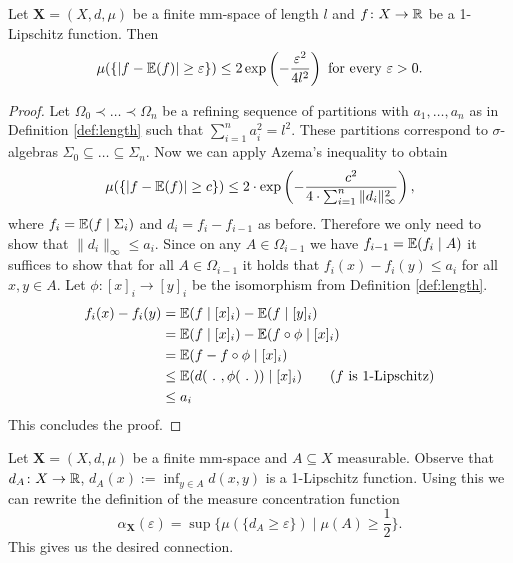 \begin{lemma}\label{lem:lipschitz}
Let $\boldsymbol{X}=(X,d,\mu)$ be a finite mm-space of length $l$ and $f\colon X\to\mathbb{R}$ be a 1-Lipschitz function. Then
\[\mu(\{|f-\mathbb{E}(f)|\geq\varepsilon\})\leq 2\exp\left(-\frac{\varepsilon^2}{4l^2}\right)\text{ for every $\varepsilon>0$.}\] 
\end{lemma}
\begin{proof}
Let 
$\Omega_0\prec\dots\prec\Omega_n$
be a refining sequence of partitions with $a_1,\dots,a_n$ as in Definition \ref{def:length} such that $\sum_{i=1}^{n}a_i^2=l^2$. These partitions correspond to $\sigma$-algebras $\Sigma_0\subseteq\dots\subseteq\Sigma_n$. Now we can apply Azema's inequality to obtain
\[\mu(\{|f-\mathbb{E}(f)|\geq c\})\leq 2\cdot\exp\left(-\frac{c^2}{4\cdot\sum_{i=1}^{n}\|d_i\|^2_\infty}\right),\]
where $f_i=\mathbb{E}(f\mid \Sigma_i)$ and $d_i=f_i-f_{i-1}$ as before. Therefore we only need to show that $\|d_i\|_\infty\leq a_i$. Since on any $A\in\Omega_{i-1}$ we have $f_{i-1}=\mathbb{E}(f_i\mid A)$ it suffices to show that for all $A\in\Omega_{i-1}$ it holds that $f_i(x)-f_i(y)\leq a_i$ for all $x,y\in A$.
Let $\phi\colon [x]_i\to [y]_i$ be the isomorphism from Definition \ref{def:length}.
\begin{align*}
f_i(x)-f_i(y)&=\mathbb{E}(f\mid [x]_i)-\mathbb{E}(f\mid [y]_i)\\
&=\mathbb{E}(f\mid [x]_i)-\mathbb{E}(f\circ\phi\mid [x]_i)\\
&=\mathbb{E}(f-f\circ\phi\mid [x]_i)\\
&\leq \mathbb{E}(d(\ .\ ,\phi(\ .\ ))\mid [x]_i)\tag{$f$ is 1-Lipschitz}\\
&\leq a_i
\end{align*}
This concludes the proof.
\end{proof}

Let $\boldsymbol{X}=(X,d,\mu)$ be a finite mm-space and $A\subseteq X$ measurable. Observe that $d_A\colon X\to\mathbb{R}$, $d_A(x):=\inf_{y\in A}d(x,y)$ is a 1-Lipschitz function. Using this we can rewrite the definition of the measure concentration function 
\[\alpha_{\boldsymbol{X}}(\varepsilon)=\sup\{\mu(\{d_A\geq\varepsilon\})\mid \mu(A)\geq\frac{1}{2}\}.\]
This gives us the desired connection.


